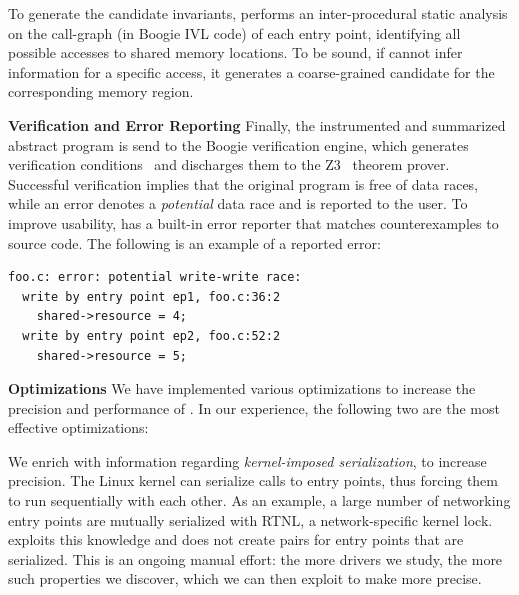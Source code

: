 To generate the candidate invariants, \whoop performs an inter-procedural static analysis on the call-graph (in Boogie IVL code) of each entry point, identifying all possible accesses to shared memory locations. To be sound, if \whoop cannot infer information for a specific access, it generates a coarse-grained candidate for the corresponding memory region.

\medskip\noindent\textbf{Verification and Error Reporting }
%
Finally, the instrumented and summarized abstract program is send to the Boogie verification engine, which generates verification conditions~\cite{barnett2005weakest} and discharges them to the Z3~\cite{de2008z3} theorem prover. Successful verification implies that the original program is free of data races, while an error denotes a \emph{potential} data race and is reported to the user. To improve usability, \whoop has a built-in error reporter that matches counterexamples to source code. The following is an example of a reported error:

\begin{lstlisting}
foo.c: error: potential write-write race:
  write by entry point ep1, foo.c:36:2
    shared->resource = 4;
  write by entry point ep2, foo.c:52:2
    shared->resource = 5;
\end{lstlisting}

\medskip\noindent\textbf{Optimizations }
%
We have implemented various optimizations to increase the precision and performance of \whoop. In our experience, the following two are the most effective optimizations:

We enrich \whoop with information regarding \emph{kernel-imposed serialization}, to increase precision. The Linux kernel can serialize calls to entry points, thus forcing them to run sequentially with each other. As an example, a large number of networking entry points are mutually serialized with RTNL, a network-specific kernel lock. \whoop exploits this knowledge and does not create pairs for entry points that are serialized. This is an ongoing manual effort: the more drivers we study, the more such properties we discover, which we can then exploit to make \whoop more precise.


